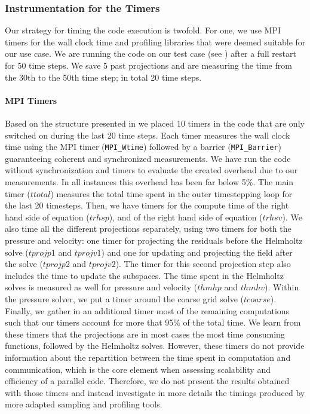 \documentclass{sig-alternate}
\begin{document}
\subsubsection{Instrumentation for the Timers}
\label{sec:timers}
Our strategy for timing the code execution is twofold. For one, we use MPI
timers for the wall clock time and profiling libraries that were deemed suitable
for our use case. We are running the code on our test case (see
) after a full restart for 50 time steps. We save 5 past
projections and are measuring the time from the 30th to the 50th time step; in
total 20 time steps. 
\paragraph{MPI Timers}
Based on the structure presented in  we placed 10 timers in the code that are
only switched on during the last 20 time steps. Each timer measures the wall
clock time using the MPI timer ({\tt MPI\_Wtime}) followed by a barrier
({\tt MPI\_Barrier}) guaranteeing coherent and synchronized measurements. We
have run the code without synchronization and timers to evaluate the created
overhead due to our measurements. In all instances this overhead has been far
below 5\%. The main timer ($ttotal$) measures the total time spent in the outer timestepping loop for the last 20 timesteps. Then, we have timers for the compute time of the right hand side of equation  ($trhsp$), and of the right hand side of equation  ($trhsv$). We also time all the different projections separately, using two timers for both the pressure and velocity: one timer for projecting the residuals before the Helmholtz solve ($tprojp1$ and $tprojv1$) and one for updating and projecting the field after the solve ($tprojp2$ and $tprojv2$). The timer for this second projection step also includes the time to update the subspaces. The time spent in the Helmholtz solves is measured as well for pressure and velocity ($thmhp$ and $thmhv$). Within the pressure solver, we put a timer around the coarse grid solve ($tcoarse$). Finally, we gather in an additional timer most of the remaining computations such that our timers account for more that 95\% of the total time. We learn from these timers that the projections are in most cases the most time consuming functions, followed by the Helmholtz solves. However, these timers do not provide information about the repartition between the time spent in computation and communication, which is the core element when assessing scalability and efficiency of a parallel code. Therefore, we do not present the results obtained with those timers and instead investigate in more details the timings produced by more adapted sampling and profiling tools.
\end{document}
